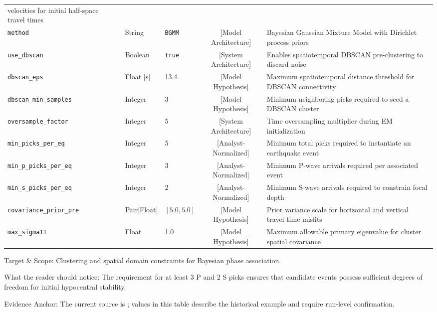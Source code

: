 \begin{landscape}
\begin{table}[htbp]
\begin{threeparttable}
\begin{tabularx}{\linewidth}{l l l c >{\raggedright\arraybackslash}X}
        velocities for initial half-space travel times \\
        \texttt{method} & String & \texttt{BGMM} & [Model
        Architecture] & Bayesian Gaussian Mixture Model with Dirichlet
        process priors \\
        \texttt{use\_dbscan} & Boolean & \texttt{true} & [System
        Architecture] & Enables spatiotemporal \ac{DBSCAN} pre-clustering
        to discard noise \\
        \texttt{dbscan\_eps} & Float [\unit{\second}] & \num{13.4} &
        [Model Hypothesis] & Maximum spatiotemporal distance threshold
        for \ac{DBSCAN} connectivity \\
        \texttt{dbscan\_min\_samples} & Integer & \num{3} & [Model
        Hypothesis] & Minimum neighboring picks required to seed a
        \ac{DBSCAN} cluster \\
        \texttt{oversample\_factor} & Integer & \num{5} & [System
        Architecture] & Time oversampling multiplier during EM initialization\\
        \texttt{min\_picks\_per\_eq} & Integer & \num{5} &
        [Analyst-Normalized] & Minimum total picks required to
        instantiate an earthquake event \\
        \texttt{min\_p\_picks\_per\_eq} & Integer & \num{3} &
        [Analyst-Normalized] & Minimum P-wave arrivals required per
        associated event \\
        \texttt{min\_s\_picks\_per\_eq} & Integer & \num{2} &
        [Analyst-Normalized] & Minimum S-wave arrivals required to
        constrain focal depth \\
        \texttt{covariance\_prior\_pre} & Pair[Float] & $[\num{5.0},
        \num{5.0}]$ &
        [Model Hypothesis] & Prior variance scale for horizontal and
        vertical travel-time misfits \\
        \texttt{max\_sigma11} & Float & \num{1.0} & [Model Hypothesis] &
        Maximum allowable primary eigenvalue for cluster spatial covariance \\
        \bottomrule
      \end{tabularx}
      \begin{tablenotes}[flushleft]
        \footnotesize
      \item Target \& Scope: Clustering and spatial domain constraints
        for Bayesian phase association.
      \item What the reader should notice: The requirement for at
        least 3 P and 2 S picks ensures that candidate events possess
        sufficient degrees of freedom for initial hypocentral stability.
      \item Evidence Anchor: The current source is
        ;
        values in this table describe the historical example and
        require run-level confirmation.
      \end{tablenotes}
    \end{threeparttable}
  \end{table}
\end{landscape}
